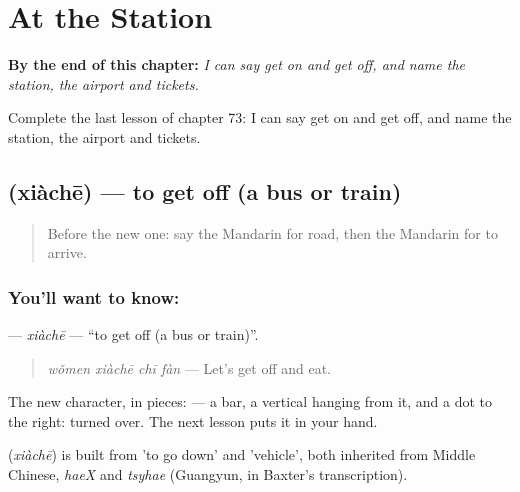 
\chapter{At the Station}
\label{ch:zh-at-the-station}

\begin{chapteropening}
\textbf{By the end of this chapter:} \emph{I can say get on and get off, and name the station, the airport and tickets.}

Complete the last lesson of chapter 73: I can say get on and get off, and name the station, the airport and tickets.
\end{chapteropening}

\section[\texorpdfstring{\zh{下车} (xiàchē)}{下车 (xiàchē)}]{ (xiàchē) — to get off (a bus or train)}

\label{lesson:ZH-C73-xiache}



\begin{quote}
Before the new one: say the Mandarin for road, then the Mandarin for to arrive.
\end{quote}

\subsection*{You'll want to know: }
\textbf{} — \emph{xiàchē} — \textquotedblleft{}to get off (a bus or train)\textquotedblright{}.

\begin{quote}
\textbf{} \emph{wǒmen xiàchē chī fàn} — Let's get off and eat.
\end{quote}

The new character, in pieces:  — a bar, a vertical hanging from it, and a dot to the right:  turned over. The next lesson puts it in your hand.

\begin{cousinweb}
\textbf{} (\emph{xiàchē}) is built from  'to go down' and  'vehicle', both inherited from Middle Chinese, \emph{haeX} and \emph{tsyhae} (Guangyun, in Baxter's transcription).
\end{cousinweb}

